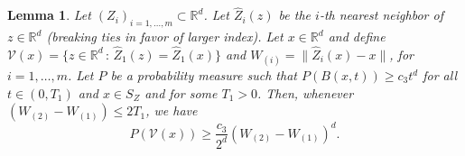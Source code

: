 \documentclass[paper=a4, fontsize=11pt]{scrartcl}
\newcommand{\PP}{\mathbb{P}}
\newtheorem{lemma}[theorem]{Lemma}
\begin{document}

%

\begin{lemma}\label{PV}
 Let $(Z_i)_{i=1,\dots,m} \subset  \mathbb R^d$. Let $\hat Z_i(z)$ be the $i$-th nearest neighbor of $z\in \mathbb R^d$ (breaking ties in favor of larger index). Let $ x\in \mathbb R^d$ and define $\mathcal V(x) = \{z\in\mathbb R^d\,:\, \hat Z_1(z) = \hat Z_1(x)\}$ and $ W_{(i)} = \| \hat Z_i(x) - x\| $, for $i=1,\ldots, m$. Let $P$ be a probability measure such that $ P ( B (x,t) )  \geq c_3 t^d $ for all $t\in (0,T_1)$ and $x \in S_{Z}$ and for some $T_1>0$. Then, whenever $ (W_{(2)} -  W_{(1)}) \leq 2T_1$, we have
   $$ P(\mathcal{V}(x) ) \geq \frac{c_3}{2^d}   (W_{(2)} -  W_{(1)}) ^d.$$
\end{lemma}
\end{document}
